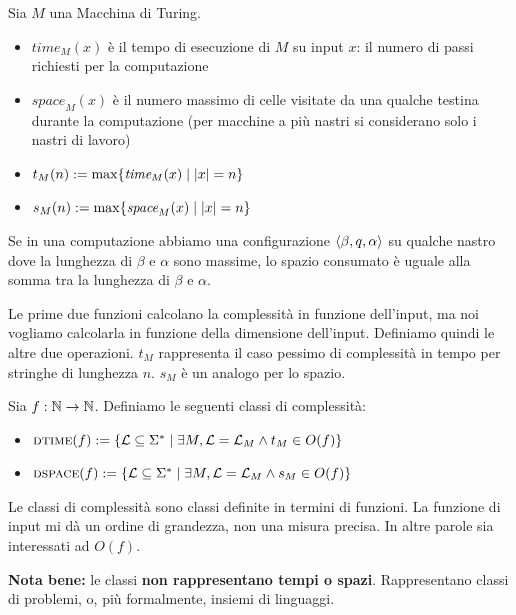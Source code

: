 \begin{defn}
    Sia $M$ una Macchina di Turing.
    \begin{itemize}
        \item $\textit{time}_{M}(x)$ è il tempo di esecuzione di $M$ su input $x$: il numero di
        passi richiesti per la computazione
        \item $\textit{space}_{M}(x)$ è il numero massimo di celle visitate da una qualche testina
        durante la computazione (per macchine a più nastri si considerano solo i nastri di lavoro)
        \item $t_{M}(n) := \max\{\textit{time}_{M}(x) \mid |x| = n\}$
        \item $s_{M}(n) := \max\{\textit{space}_{M}(x) \mid |x| = n\}$
    \end{itemize}
\end{defn}

Se in una computazione abbiamo una configurazione $\langle \beta, q, \alpha \rangle$ su qualche nastro dove
la lunghezza di $\beta$ e $\alpha$ sono massime, lo spazio consumato è uguale alla somma tra la
lunghezza di $\beta$ e $\alpha$.

Le prime due funzioni calcolano la complessità in funzione dell'input, ma noi vogliamo calcolarla
in funzione della dimensione dell'input. Definiamo quindi le altre due operazioni. $t_{M}$
rappresenta il caso pessimo di complessità in tempo per stringhe di lunghezza $n$. $s_{M}$ è un
analogo per lo spazio.

\begin{defn}
    Sia $f:\mathbb{N} \to \mathbb{N}$. Definiamo le seguenti classi di complessità:
    \begin{itemize}
        \item $\textsc{dtime}(f) := \{\mathcal{L} \subseteq \Sigma^{*} \mid \exists M, \mathcal{L} = \mathcal{L}_{M} \land
        t_{M} \in O(f)\}$
        \item $\textsc{dspace}(f) := \{\mathcal{L} \subseteq \Sigma^{*} \mid \exists M, \mathcal{L} = \mathcal{L}_{M} \land
        s_{M} \in O(f)\}$
    \end{itemize}
\end{defn}

Le classi di complessità sono classi definite in termini di funzioni. La funzione di input mi dà
un ordine di grandezza, non una misura precisa. In altre parole sia interessati ad $O(f)$.

\textbf{Nota bene:} le classi \textbf{non rappresentano tempi o spazi}. Rappresentano classi di
problemi, o, più formalmente, insiemi di linguaggi.

